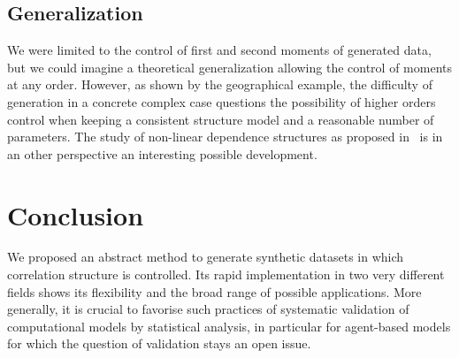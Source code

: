 \subsection*{Generalization}

We were limited to the control of first and second moments of generated data, but we could imagine a theoretical generalization allowing the control of moments at any order. However, as shown by the geographical example, the difficulty of generation in a concrete complex case questions the possibility of higher orders control when keeping a consistent structure model and a reasonable number of parameters. The study of non-linear dependence structures as proposed in~\cite{chicheportiche2013nested} is in an other perspective an interesting possible development.





\section{Conclusion}


We proposed an abstract method to generate synthetic datasets in which correlation structure is controlled. Its rapid implementation in two very different fields shows its flexibility and the broad range of possible applications. More generally, it is crucial to favorise such practices of systematic validation of computational models by statistical analysis, in particular for agent-based models for which the question of validation stays an open issue.


